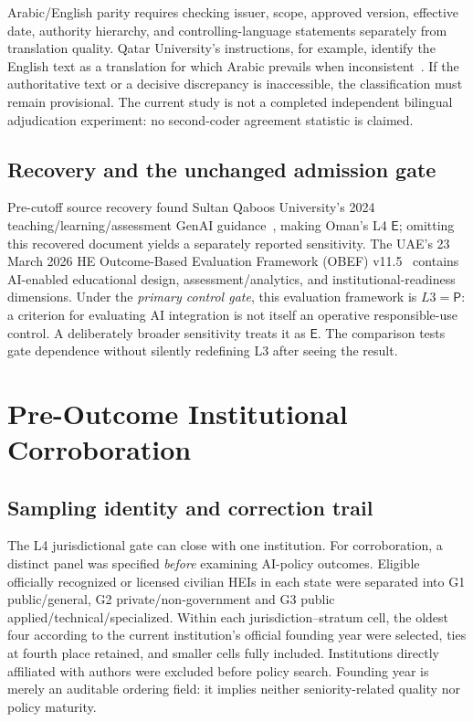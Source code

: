 \documentclass[conference,letterpaper]{IEEEtran}
\newcommand{\stE}{\textsf{E}}
\newcommand{\stP}{\textsf{P}}
\begin{document}
Arabic/English parity requires checking issuer, scope, approved version, effective date, authority hierarchy, and controlling-language statements separately from translation quality. Qatar University's instructions, for example, identify the English text as a translation for which Arabic prevails when inconsistent~\cite{qataru}. If the authoritative text or a decisive discrepancy is inaccessible, the classification must remain provisional. The current study is not a completed independent bilingual adjudication experiment: no second-coder agreement statistic is claimed.

\subsection{Recovery and the unchanged admission gate}
Pre-cutoff source recovery found Sultan Qaboos University's 2024 teaching/learning/assessment GenAI guidance~\cite{squ}, making Oman's L4 $\stE$; omitting this recovered document yields a separately reported sensitivity. The UAE's 23 March 2026 HE Outcome-Based Evaluation Framework (OBEF) v11.5~\cite{obef} contains AI-enabled educational design, assessment/analytics, and institutional-readiness dimensions. Under the \emph{primary control gate}, this evaluation framework is $L3=\stP$: a criterion for evaluating AI integration is not itself an operative responsible-use control. A deliberately broader sensitivity treats it as $\stE$. The comparison tests gate dependence without silently redefining L3 after seeing the result.


\section{Pre-Outcome Institutional Corroboration}
\subsection{Sampling identity and correction trail}
The L4 jurisdictional gate can close with one institution. For corroboration, a distinct panel was specified \emph{before} examining AI-policy outcomes. Eligible officially recognized or licensed civilian HEIs in each state were separated into G1 public/general, G2 private/non-government and G3 public applied/technical/specialized. Within each jurisdiction--stratum cell, the oldest four according to the current institution's official founding year were selected, ties at fourth place retained, and smaller cells fully included. Institutions directly affiliated with authors were excluded before policy search. Founding year is merely an auditable ordering field: it implies neither seniority-related quality nor policy maturity.
\end{document}
